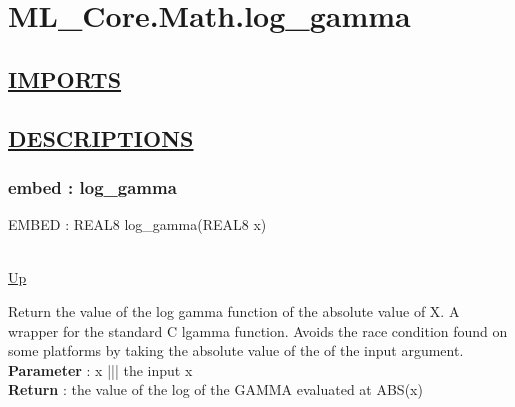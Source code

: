 \chapter*{ML\_Core.Math.log\_gamma}
\hypertarget{ML_Core.Math.log_gamma}{}

\section*{\underline{IMPORTS}}

\section*{\underline{DESCRIPTIONS}}
\subsection*{embed : log\_gamma}
\hypertarget{ecldoc:ml_core.math.log_gamma}{EMBED : REAL8 log\_gamma(REAL8 x)} \\
\hyperlink{ecldoc:}{Up} \\
\par
Return the value of the log gamma function of the absolute value of X. A wrapper for the standard C lgamma function. Avoids the race condition found on some platforms by taking the absolute value of the of the input argument. \\
\textbf{Parameter} : x ||| the input x \\
\textbf{Return} : the value of the log of the GAMMA evaluated at ABS(x) \\
